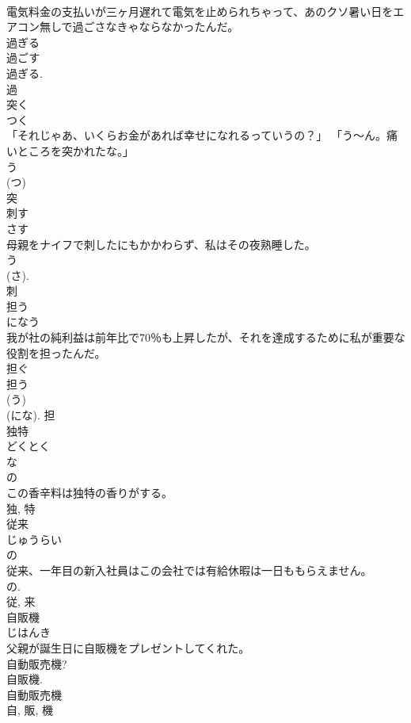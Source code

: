 \documentclass[8pt]{extreport}
\begin{document}
\begin{CJK}{UTF8}{min}
\\	電気料金の支払いが三ヶ月遅れて電気を止められちゃって、あのクソ暑い日をエアコン無しで過ごさなきゃならなかったんだ。	
\\	過ぎる 
\\	過ごす 
\\	過ぎる. 
\\	過	
\\	突く	
\\	つく	
\\	「それじゃあ、いくらお金があれば幸せになれるっていうの？」 「う～ん。痛いところを突かれたな。」	
\\	う 
\\	(つ) 
\\	突	
\\	刺す	
\\	さす	
\\	母親をナイフで刺したにもかかわらず、私はその夜熟睡した。	
\\	う 
\\	(さ). 
\\	刺	
\\	担う	
\\	になう	
\\	我が社の純利益は前年比で70％も上昇したが、それを達成するために私が重要な役割を担ったんだ。	
\\	担ぐ 
\\	担う 
\\	(う) 
\\	(にな).	担	
\\	独特	
\\	どくとく	
\\	な 
\\	の 
\\	この香辛料は独特の香りがする。	
\\	独, 特	
\\	従来	
\\	じゅうらい	
\\	の 
\\	従来、一年目の新入社員はこの会社では有給休暇は一日ももらえません。	
\\	の. 
\\	従, 来	
\\	自販機	
\\	じはんき	
\\	父親が誕生日に自販機をプレゼントしてくれた。	
\\	自動販売機? 
\\	自販機.	
\\	自動販売機 
\\	自, 販, 機	

\end{CJK}
\end{document}
